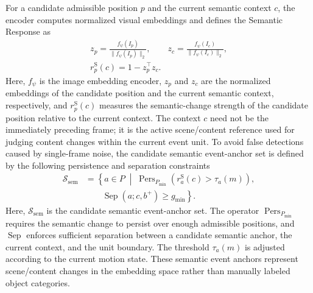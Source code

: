 \documentclass[journal]{IEEEtran}
\begin{document}
For a candidate admissible position \(p\) and the current semantic context \(c\), the encoder computes normalized visual embeddings and defines the Semantic Response as
\begin{equation}
\begin{gathered}
z_p=\frac{f_{\psi}(I_p)}{\|f_{\psi}(I_p)\|_2},
\qquad
z_c=\frac{f_{\psi}(I_c)}{\|f_{\psi}(I_c)\|_2},\\
r^{\mathrm{S}}_p(c)=1-z_p^{\top}z_c.
\end{gathered}
\label{eq:semantic_response}
\end{equation}
Here, \(f_{\psi}\) is the image embedding encoder, \(z_p\) and \(z_c\) are the normalized embeddings of the candidate position and the current semantic context, respectively, and \(r^{\mathrm{S}}_p(c)\) measures the semantic-change strength of the candidate position relative to the current context. The context \(c\) need not be the immediately preceding frame; it is the active scene/content reference used for judging content changes within the current event unit. To avoid false detections caused by single-frame noise, the candidate semantic event-anchor set is defined by the following persistence and separation constraints
\begin{equation}
\begin{aligned}
\mathcal{S}_{\mathrm{sem}}
&=
\left\{
a\in P
\;\middle|\;
\operatorname{Pers}_{P_{\min}}
\left(r^{\mathrm{S}}_a(c)>\tau_a(m)\right),
\right.\\
&\qquad\left.
\operatorname{Sep}(a;c,b^+)\ge g_{\min}
\right\}.
\end{aligned}
\label{eq:semantic_anchor_admission}
\end{equation}
Here, \(\mathcal{S}_{\mathrm{sem}}\) is the candidate semantic event-anchor set. The operator \(\operatorname{Pers}_{P_{\min}}\) requires the semantic change to persist over enough admissible positions, and \(\operatorname{Sep}\) enforces sufficient separation between a candidate semantic anchor, the current context, and the unit boundary. The threshold \(\tau_a(m)\) is adjusted according to the current motion state. These semantic event anchors represent scene/content changes in the embedding space rather than manually labeled object categories.
\end{document}
